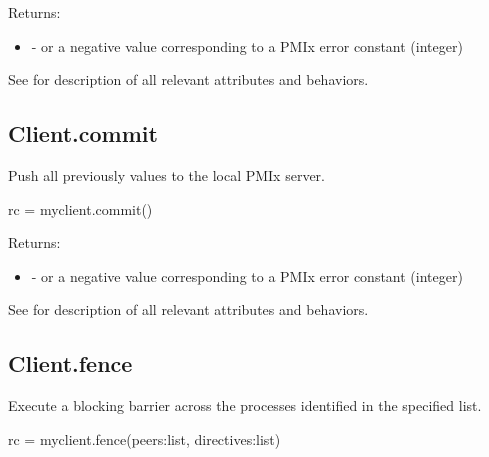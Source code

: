 Returns:

\begin{itemize}
    \item {} -  or a negative value corresponding to a PMIx error constant (integer)
\end{itemize}

See  for description of all relevant attributes and behaviors.


\subsection{Client.commit}

\summary

Push all previously  values to the local PMIx server.

\format

\pyspecificstart
\begin{codepar}
rc = myclient.commit()
\end{codepar}
\pyspecificend

Returns:

\begin{itemize}
    \item {} -  or a negative value corresponding to a PMIx error constant (integer)
\end{itemize}

See  for description of all relevant attributes and behaviors.


\subsection{Client.fence}

\summary

Execute a blocking barrier across the processes identified in the specified list.

\format

\pyspecificstart
\begin{codepar}
rc = myclient.fence(peers:list, directives:list)
\end{codepar}
\pyspecificend

\begin{arglist}
\end{arglist}

